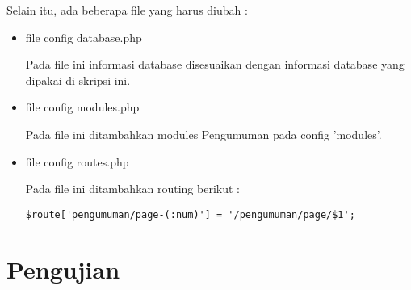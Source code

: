Selain itu, ada beberapa file yang harus diubah :
\begin{itemize}
\item file config database.php

Pada file ini informasi database disesuaikan dengan informasi database yang dipakai di skripsi ini.

\item file config modules.php

Pada file ini ditambahkan modules Pengumuman pada config 'modules'.

\item file config routes.php

Pada file ini ditambahkan routing berikut :
\begin{lstlisting}
$route['pengumuman/page-(:num)'] = '/pengumuman/page/$1';
\end{lstlisting}
\end{itemize}

\section{Pengujian}